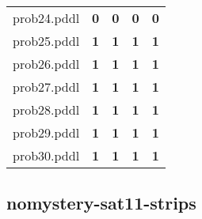 \documentclass{article}
\begin{document}
\begin{tabular}{@{}lrrrr@{}}
prob24.pddl & \textbf{0} & \textbf{0} & \textbf{0} & \textbf{0} \\
prob25.pddl & \textbf{1} & \textbf{1} & \textbf{1} & \textbf{1} \\
prob26.pddl & \textbf{1} & \textbf{1} & \textbf{1} & \textbf{1} \\
prob27.pddl & \textbf{1} & \textbf{1} & \textbf{1} & \textbf{1} \\
prob28.pddl & \textbf{1} & \textbf{1} & \textbf{1} & \textbf{1} \\
prob29.pddl & \textbf{1} & \textbf{1} & \textbf{1} & \textbf{1} \\
prob30.pddl & \textbf{1} & \textbf{1} & \textbf{1} & \textbf{1} \\
\end{tabular}

\hypertarget{coverage-nomystery-sat11-strips}{}
\subsection*{nomystery-sat11-strips}
\end{document}
